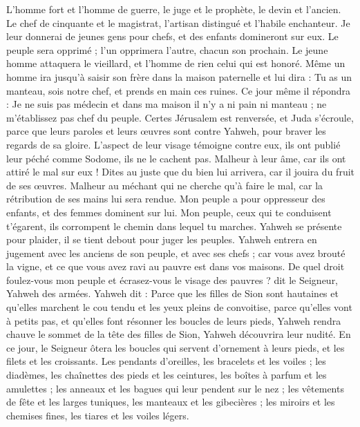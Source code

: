 \begin{multicols}{2}
L'homme fort et l'homme de guerre, le juge et le prophète, le devin et l'ancien.
Le chef de cinquante et le magistrat, l’artisan distingué et l’habile enchanteur.
Je leur donnerai de jeunes gens pour chefs, et des enfants domineront sur eux.
Le peuple sera opprimé ; l’un opprimera l'autre, chacun son prochain. Le jeune homme attaquera le vieillard, et l'homme de rien celui qui est honoré.
Même un homme ira jusqu’à saisir son frère dans la maison paternelle et lui dira : Tu as un manteau, sois notre chef, et prends en main ces ruines.
Ce jour même il répondra : Je ne suis pas médecin et dans ma maison il n'y a ni pain ni manteau ; ne m’établissez pas chef du peuple.
Certes Jérusalem est renversée, et Juda s’écroule, parce que leurs paroles et leurs œuvres sont contre Yahweh, pour braver les regards de sa gloire.
L’aspect de leur visage témoigne contre eux, ils ont publié leur péché comme Sodome, ils ne le cachent pas. Malheur à leur âme, car ils ont attiré le mal sur eux !
Dites au juste que du bien lui arrivera, car il jouira du fruit de ses œuvres.
Malheur au méchant qui ne cherche qu'à faire le mal, car la rétribution de ses mains lui sera rendue.
Mon peuple a pour oppresseur des enfants, et des femmes dominent sur lui. Mon peuple, ceux qui te conduisent t’égarent, ils corrompent le chemin dans lequel tu marches.
Yahweh se présente pour plaider, il se tient debout pour juger les peuples.
Yahweh entrera en jugement avec les anciens de son peuple, et avec ses chefs ; car vous avez brouté la vigne, et ce que vous avez ravi au pauvre est dans vos maisons.
De quel droit foulez-vous mon peuple et écrasez-vous le visage des pauvres ? dit le Seigneur, Yahweh des armées.
Yahweh dit : Parce que les filles de Sion sont hautaines et qu’elles marchent le cou tendu et les yeux pleins de convoitise, parce qu’elles vont à petits pas, et qu’elles font résonner les boucles de leurs pieds,
Yahweh rendra chauve le sommet de la tête des filles de Sion, Yahweh découvrira leur nudité.
En ce jour, le Seigneur ôtera les boucles qui servent d’ornement à leurs pieds, et les filets et les croissants.
Les pendants d’oreilles, les bracelets et les voiles ;
les diadèmes, les chaînettes des pieds et les ceintures, les boîtes à parfum et les amulettes ;
les anneaux et les bagues qui leur pendent sur le nez ;
les vêtements de fête et les larges tuniques, les manteaux et les gibecières ;
les miroirs et les chemises fines, les tiares et les voiles légers.

\end{multicols}
